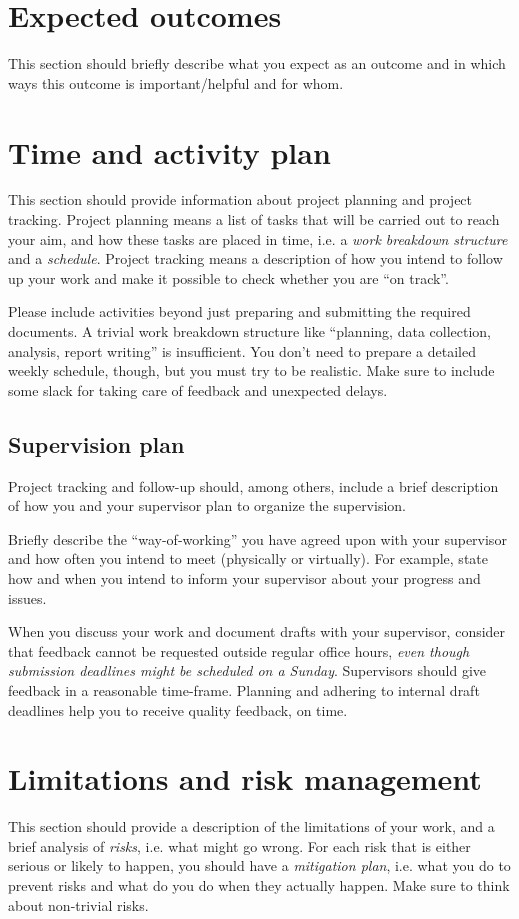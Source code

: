 \documentclass[12pt,a4paper,twoside]{article}
\begin{document}
\section{Expected outcomes}
\label{sec:outcome}
This section should briefly describe what you expect as an outcome and in which ways this outcome is important/helpful and for whom. 


\section{Time and activity plan}
\label{sec:plan}
This section should provide information about project planning and project tracking.
Project planning means a list of tasks that will be carried out to reach your aim,
and how these tasks are placed in time, i.e. a \textit{work breakdown structure}
and a \textit{schedule}.
Project tracking means a description of how you intend to follow up your work and make it possible to check whether you are ``on track''.

Please include activities beyond just preparing and submitting the required documents.
A trivial work breakdown structure like ``planning, data collection, analysis,
report writing'' is insufficient. You don't need to prepare a detailed weekly
schedule, though, but you must try to be realistic.
Make sure to include some slack for taking care of feedback and unexpected delays.

\subsection{Supervision plan}
Project tracking and follow-up should, among others, include a brief description of how you and your supervisor plan to organize the supervision.

Briefly describe the ``way-of-working'' you have agreed upon with your supervisor and how often you intend to meet (physically or virtually). For example, state how and when you intend to inform your supervisor about your progress and issues. 

When you discuss your work and document drafts with your supervisor, consider that feedback cannot be requested outside regular office hours, \emph{even though submission deadlines might be scheduled on a Sunday}. Supervisors should give feedback in a reasonable time-frame. Planning and adhering to internal draft deadlines help you to receive quality feedback, on time. 


\section{Limitations and risk management}
\label{sec:risks}
This section should provide a description of the limitations of your
work, and a brief analysis of \textit{risks}, i.e. what might go wrong. For each risk that
is either serious or likely to happen, you should have a \textit{mitigation plan}, i.e.
what you do to prevent risks and what do you do when they actually happen.
Make sure to think about non-trivial risks.
\end{document}
